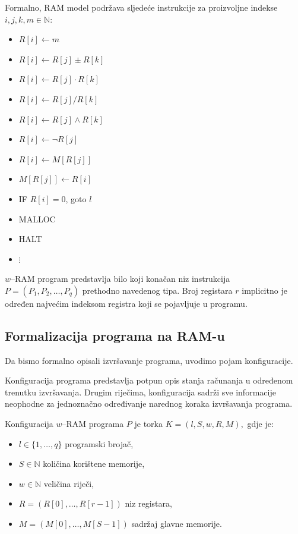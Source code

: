 Formalno, RAM model podržava sljedeće instrukcije za proizvoljne indekse
$i,j,k,m\in\mathbb{N}$:

\begin{itemize}
	\item $R[i] \gets m$
	\item $R[i] \gets R[j] \pm R[k]$
	\item $R[i] \gets R[j]\cdot R[k]$
	\item $R[i] \gets R[j]/R[k]$
	\item $R[i] \gets R[j]\wedge R[k]$
	\item $R[i] \gets \neg R[j]$
	\item $R[i] \gets M[R[j]]$
	\item $M[R[j]] \gets R[i]$
	\item IF $R[i]=0$, goto $l$
	\item MALLOC
	\item HALT
	\item $\vdots$
\end{itemize}

\begin{definition}
	$w$--RAM program predstavlja bilo koji konačan niz instrukcija $
	P=(P_1,P_2,\ldots,P_q)
	$ 	prethodno navedenog tipa. Broj registara $r$ implicitno je određen najvećim indeksom registra koji se pojavljuje u programu.
\end{definition}

\subsection{Formalizacija programa na RAM-u}

Da bismo formalno opisali izvršavanje programa, uvodimo pojam konfiguracije.

Konfiguracija programa predstavlja potpun opis stanja računanja u određenom trenutku izvršavanja. Drugim riječima, konfiguracija sadrži sve informacije neophodne za jednoznačno određivanje narednog koraka izvršavanja programa.

\begin{definition}
	Konfiguracija $w$--RAM programa $P$ je torka $
	K=(l,S,w,R,M), $	gdje je:
	
	\begin{itemize}
		\item $l \in \{1,\ldots,q\}$ programski brojač,
		\item $S\in\mathbb{N}$ količina korištene memorije,
		\item $w\in\mathbb{N}$ veličina riječi,
		\item $R=(R[0],\ldots,R[r-1])$ niz registara,
		\item $M=(M[0],\ldots,M[S-1])$ sadržaj glavne memorije.
	\end{itemize}
\end{definition}

